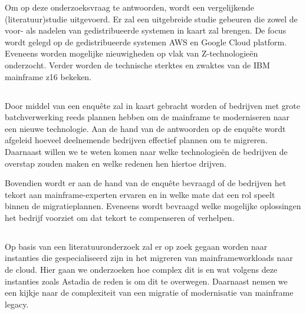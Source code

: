 Om op deze onderzoeksvraag te antwoorden, wordt een vergelijkende (literatuur)studie uitgevoerd. Er zal een uitgebreide studie gebeuren die zowel de voor- als nadelen van gedistribueerde systemen in kaart zal brengen. De focus wordt gelegd op de gedistribueerde systemen AWS en Google Cloud platform. Eveneens worden mogelijke nieuwigheden op vlak van Z-technologieën onderzocht. Verder worden de technische sterktes en zwaktes van de IBM mainframe z16 bekeken.

\subsection{}

Door middel van een enquête zal in kaart gebracht worden of bedrijven met grote batchverwerking reeds plannen hebben om de mainframe te moderniseren naar een nieuwe technologie. Aan de hand van de antwoorden op de enquête wordt afgeleid hoeveel deelnemende bedrijven effectief plannen om te migreren. Daarnaast willen we te weten komen naar welke technologieën de bedrijven de overstap zouden maken en welke redenen hen hiertoe drijven. 

Bovendien wordt er aan de hand van de enquête bevraagd of de bedrijven het tekort aan mainframe-experten ervaren en in welke mate dat een rol speelt binnen de migratieplannen. Eveneens wordt bevraagd welke mogelijke oplossingen het bedrijf voorziet om dat tekort te compenseren of verhelpen. 

\subsection{}

Op basis van een literatuuronderzoek zal er op zoek gegaan worden naar instanties die gespecialiseerd zijn in het migreren van mainframeworkloads naar de cloud. Hier gaan we onderzoeken hoe complex dit is en wat volgens deze instanties zoals Astadia de reden is om dit te overwegen. Daarnaast nemen we een kijkje naar de complexiteit van een migratie of modernisatie van mainframe legacy. 

